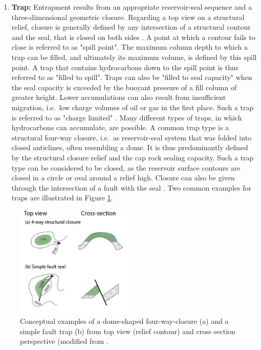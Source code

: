 \begin{enumerate}
        	\item \textbf{Trap:} Entrapment results from an appropriate reservoir-seal sequence and a three-dimensional geometric closure. Regarding a top view on a structural relief, closure is generally defined by any intersection of a structural contour and the seal, that is closed on both sides \citep{dolson2016basics, sorkhabi2005place, north1985petroleum}. A point at which a contour fails to close is referred to as "spill point". The maximum column depth to which a trap can be filled, and ultimately its maximum volume, is defined by this spill point. A trap that contains hydrocarbons down to the spill point is thus referred to as "filled to spill". Traps can also be "filled to seal capacity" when the seal capacity is exceeded by the buoyant pressure of a fill column of greater height. Lower accumulations can also result from insufficient migration, i.e.\ low charge volumes of oil or gas in the first place. Such a trap is referred to as "charge limited" \citep{dolson2016basics}. Many different types of traps, in which hydrocarbons can accumulate, are possible. A common trap type is a structural four-way closure, i.e.\ as reservoir-seal system that was folded into closed anticlines, often resembling a dome. It is thus predominantly defined by the structural closure relief and the cap rock sealing capacity. Such a trap type can be considered to be closed, as the reservoir surface contours are closed in a circle or oval around a relief high. Closure can also be given through the intersection of a fault with the seal \citep{dolson2016basics, north1985petroleum}. Two common examples for traps are illustrated in Figure \ref{fig:trap_types}.
        \end{enumerate}
        \begin{figure}[h]
        	\centering
        	\includegraphics[width=0.5\textwidth]{Figures/trap_closure1}
        	\caption{Conceptual examples of a dome-shaped four-way-closure (a) and a simple fault trap (b) from top view (relief contour) and cross section perspective (modified from \citet{dolson2016basics}.}\label{fig:trap_types}
        \end{figure}        

